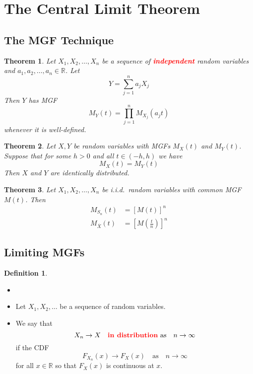 \documentclass{article}
\newcommand{\R}{\mathbb{R}}
\newcommand{\bfred}[1]{\textcolor{red}{\textbf{#1}}}
\theoremstyle{plain}
\newtheorem{thm}{Theorem}[section]
\theoremstyle{definition}
\newtheorem{defn}{Definition}[section]
\theoremstyle{remark}
\begin{document}
\section{The Central Limit Theorem}

\subsection{The MGF Technique}

\begin{thm}
    Let $X_1,X_2,\dotsc,X_n$ be a sequence of \bfred{independent} random variables and $a_1,a_2,\dotsc,a_n\in\R$. Let
    \[Y=\sum_{j=1}^na_jX_j\] Then $Y$ has MGF \[M_Y(t)=\prod_{j=1}^nM_{X_j}(a_jt)\] whenever it is well-defined.
\end{thm}

\begin{thm}
    Let $X,Y$ be random variables with MGFs $M_X(t)$ and $M_Y(t)$. Suppose that for some $h>0$ and all $t\in(-h,h)$ we have \[M_X(t)=M_Y(t)\] Then $X$ and $Y$ are identically distributed.
\end{thm}

\begin{thm}
    Let $X_1,X_2,\dotsc,X_n$ be i.i.d.\ random variables with common MGF $M(t)$. Then
    \begin{align*}
        M_{S_n}(t)&=[M(t)]^n\\
        M_{\overline{X}}(t)&=[M(\textstyle\frac{t}{n})]^n
    \end{align*}
\end{thm}

\subsection{Limiting MGFs}

\begin{defn}
    \begin{itemize}
        \item []
        \item Let $X_1,X_2,\dotsc$ be a sequence of random variables.
        \item We say that \[X_n\rightarrow X\quad\text{\bfred{in distribution} as} \quad n\rightarrow\infty\] if the CDF \[F_{X_n}(x)\rightarrow F_X(x)\quad \text{as} \quad n\rightarrow\infty\] for all $x\in\R$ so that $F_X(x)$ is continuous at $x$.
    \end{itemize}
\end{defn}
\end{document}
